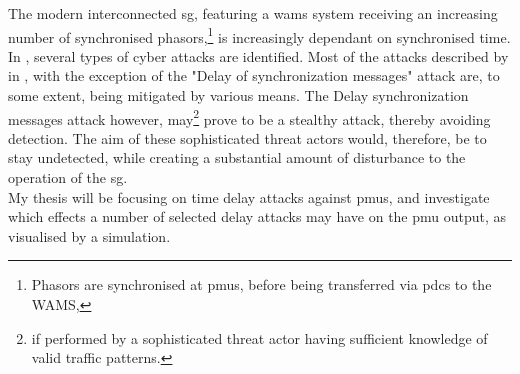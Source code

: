 The modern interconnected \acrshort{sg}, featuring a \acrshort{wams} system receiving an increasing number of synchronised phasors,\footnote{Phasors are synchronised at \acrshort{pmu}s, before being transferred via \acrshort{pdc}s to the WAMS,}  is increasingly dependant on synchronised time.
In \cite{ullmann2009delay}, several types of cyber attacks are identified. Most of the attacks described by \citeauthor{ullmann2009delay}in \cite{ullmann2009delay}, with the exception of the "Delay of synchronization messages" attack are, to some extent, being mitigated by various means. The 
Delay  synchronization messages attack however, may\footnote{if performed by a sophisticated threat actor having sufficient knowledge of valid traffic patterns.} prove to be a stealthy attack, thereby avoiding detection.  The aim of these sophisticated threat actors would, therefore, be to stay undetected, while creating a substantial amount of disturbance to the operation of the \acrshort{sg}. \\ 
My thesis will be focusing on time delay attacks against \acrshort{pmu}s, and investigate which effects a number of selected delay attacks may have on the \acrshort{pmu} output, as visualised by a simulation. 


